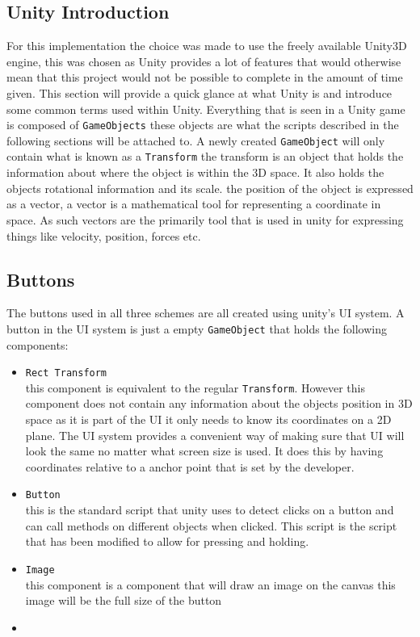 \subsection{Unity Introduction}
For this implementation the choice was made to use the freely available Unity3D engine, this was chosen as Unity provides a lot of features that would otherwise mean that this project would not be possible to complete in the amount of time given. This section will provide a quick glance at what Unity is and introduce some common terms used within Unity. Everything that is seen in a Unity game is composed of {\tt GameObjects} these objects are what the scripts described in the following sections will be attached to. A newly created {\tt GameObject} will only contain what is known as a {\tt Transform} the transform is an object that holds the information about where the object is within the 3D space. It also holds the objects rotational information  and its scale.
the position of the object is expressed as a vector, a vector is a mathematical tool for representing a coordinate in space. As such vectors are the primarily tool that is used in unity for expressing things like velocity, position, forces etc.
\subsection{Buttons}
The buttons used in all three schemes are all created using unity's UI system. A button in the UI system is just a empty {\tt GameObject} that holds the following components:
\begin{itemize}
\item {\tt Rect Transform}\\
this component is equivalent to the regular {\tt Transform}.  However this component does not contain any information about the objects position in 3D space as it is part of the UI it only needs to know its coordinates on a 2D plane. The UI system provides a convenient way of making sure that UI will look the same no matter what screen size is used. It does this by having coordinates relative to a anchor point that is set by the developer. 
\item {\tt Button}\\
this is the standard script that unity uses to detect clicks on a button and can call methods on different objects when clicked. This script is the script that has been modified to allow for pressing and holding.
\item {\tt Image} \\
this component is a component that will draw an image on the canvas this image will be the full size of the button
\item 
\end{itemize}
